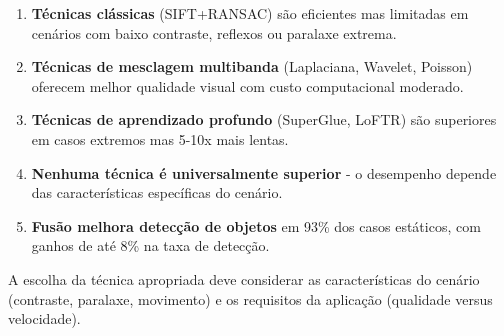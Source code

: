 \begin{enumerate}
\item \textbf{Técnicas clássicas} (SIFT+RANSAC) são eficientes mas limitadas em cenários com baixo contraste, reflexos ou paralaxe extrema.
\item \textbf{Técnicas de mesclagem multibanda} (Laplaciana, Wavelet, Poisson) oferecem melhor qualidade visual com custo computacional moderado.
\item \textbf{Técnicas de aprendizado profundo} (SuperGlue, LoFTR) são superiores em casos extremos mas 5-10x mais lentas.
\item \textbf{Nenhuma técnica é universalmente superior} - o desempenho depende das características específicas do cenário.
\item \textbf{Fusão melhora detecção de objetos} em 93\% dos casos estáticos, com ganhos de até 8\% na taxa de detecção.
\end{enumerate}

A escolha da técnica apropriada deve considerar as características do cenário (contraste, paralaxe, movimento) e os requisitos da aplicação (qualidade versus velocidade).

